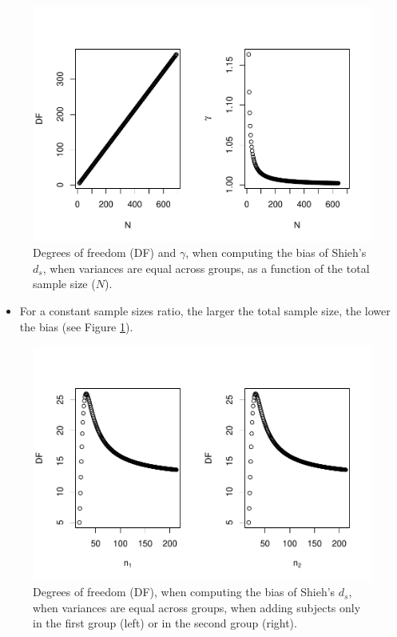 \documentclass[
  english,
  man,mask]{apa6}
\providecommand{\tightlist}{%
  \setlength{\itemsep}{0pt}\setlength{\parskip}{0pt}}
\begin{document}
\begin{figure}
\centering
\includegraphics{Theoretical-Bias-of-all-estimators-as-a-function-of-population-parameters_files/figure-latex/biasshiehhomNsize2-1.pdf}
\caption{\label{fig:biasshiehhomNsize2}Degrees of freedom (DF) and \(\gamma\), when computing the bias of Shieh's \(d_s\), when variances are equal across groups, as a function of the total sample size (\(N\)).}
\end{figure}

\begin{itemize}
\tightlist
\item
  For a constant sample sizes ratio, the larger the total sample size, the lower the bias (see Figure \ref{fig:biasshiehhomNsize2}).
\end{itemize}

\begin{figure}
\centering
\includegraphics{Theoretical-Bias-of-all-estimators-as-a-function-of-population-parameters_files/figure-latex/biasshiehhomuneqNsize2-1.pdf}
\caption{\label{fig:biasshiehhomuneqNsize2}Degrees of freedom (DF), when computing the bias of Shieh's \(d_s\), when variances are equal across groups, when adding subjects only in the first group (left) or in the second group (right).}
\end{figure}
\end{document}
